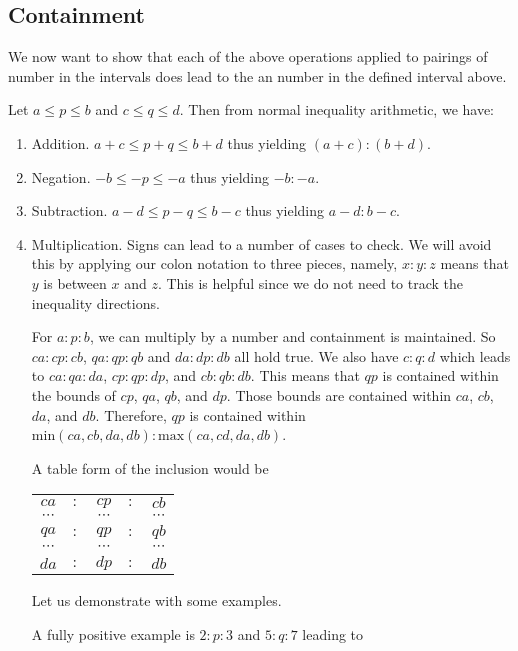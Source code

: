 \documentclass[12pt]{article}
\begin{document}
\subsection{Containment}\label{containment}

We now want to show that each of the above operations applied to pairings of number in the intervals  does lead to the an number in the defined interval above. 

Let $a \leq p \leq b$ and $c\leq  q \leq  d$. Then from normal inequality arithmetic, we have: 

\begin{enumerate}
    \item Addition.   $a +c \leq  p + q \leq  b +d$ thus yielding $(a+c):(b+d)$.
    \item Negation.  $-b \leq -p \leq -a$ thus yielding $-b:-a$.
    \item Subtraction.  $a - d \leq p-q \leq b -c$  thus yielding $a-d:b-c$.
    \item Multiplication. Signs can lead to a number of cases to check. We will avoid this by  applying our colon notation to three pieces, namely,  $x:y:z$ means that $y$ is between $x$ and $z$. This is helpful since we do not need to track the inequality directions. 
    
    For $a:p:b$, we can multiply by a number and containment is maintained. So $ca:cp:cb$, $qa: qp: qb$ and $da:dp:db$ all hold true. We also have $c:q:d$ which leads to $ca:qa:da$, $cp:qp:dp$, and $cb:qb:db$. This means that $qp$ is contained within the bounds of $cp$, $qa$, $qb$, and $dp$. Those bounds are contained within $ca$, $cb$, $da$, and $db$. Therefore, $qp$ is contained within $\mathrm{min}(ca, cb, da, db):\mathrm{max}(ca, cd, da, db)$. 
    
    A table form of the inclusion would be 
    
    \begin{tabular}{ccccc}
        $ca$ &$:$& $cp$ &$:$& $cb$ \\
        $\cdots$ & & $\cdots$ & & $\cdots$ \\
        $qa$ &$:$& $qp$ &$:$& $qb$\\
        $\cdots$ & & $\cdots$ & & $\cdots$ \\
         $da$ &$:$& $dp$&$:$& $db$
    \end{tabular}
    
    Let us demonstrate with some examples. 
    
    A fully positive example is $2:p:3$ and $5:q:7$ leading to 
    

\end{enumerate}
\end{document}
